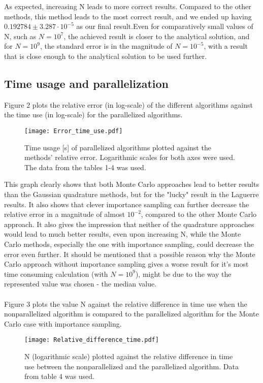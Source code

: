 \documentclass[10pt,a4paper]{article}
\begin{document}
As expected, increasing N leads to more correct results. Compared to the other methods, this method leads to the most correct result, and we ended up having $0.192784\pm 3.287\cdot10^{-5}$ as our final result.Even for comparatively small values of N, such as $N=10^7$, the achieved result is closer to the analytical solution, and for  $N=10^9$, the standard error is in the magnitude of $N=10^{-5}$, with a result that is close enough to the analytical solution to be used further.
\subsection{Time usage and parallelization}
Figure 2 plots the relative error (in log-scale) of the different algorithms against the time use (in log-scale) for the parallelized algorithms.
\begin{figure}[H]
\centering
\texttt{[image: Error\_time\_use.pdf]}
\caption[Time vs. relative error]{Time usage [s] of parallelized algorithms plotted against the methods' relative error. Logarithmic scales for both axes were used. The data from the tables 1-4 was used.}
\end{figure}
This graph clearly shows that both Monte Carlo approaches lead to better results than the Gaussian quadrature methods, but for the "lucky" result in the Laguerre results. It also shows that clever importance sampling can further decrease the relative error in a magnitude of almost $10^{-2}$, compared to the  other Monte Carlo approach. It also gives the impression that neither of the quadrature approaches would lead to much better results, even upon increasing N, while the Monte Carlo methods, especially the one with importance sampling, could decrease the error even further. It should be mentioned that a possible reason why the Monte Carlo approach without importance sampling gives a worse result for it's most time consuming calculation (with $N=10^9$), might be due to the way the represented value was chosen - the median value. \\\\
Figure 3 plots the value N against the relative difference in time use when the nonparallelized algorithm is compared to the parallelized algorithm for the Monte Carlo case with importance sampling.
\begin{figure}[H]
\centering
\texttt{[image: Relative\_difference\_time.pdf]}
\caption[N vs. relative time use]{N (logarithmic scale) plotted against the relative difference in time use between the nonparallelized and the parallelized algorithm. Data from table 4 was used.}
\end{figure}
\end{document}

